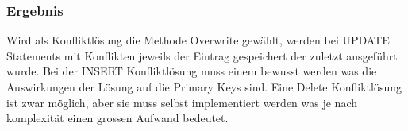 \documentclass[11pt,a4paper,parskip=half]{scrartcl}
\begin{document}
\subsubsection{Ergebnis}
Wird als Konfliktlösung die Methode Overwrite gewählt, werden bei UPDATE Statements mit Konflikten jeweils der Eintrag gespeichert der zuletzt ausgeführt wurde. Bei der INSERT Konfliktlösung muss einem bewusst werden was die Auswirkungen der Lösung auf die Primary Keys sind. Eine Delete Konfliktlösung ist zwar möglich, aber sie muss selbst implementiert werden was je nach komplexität einen grossen Aufwand bedeutet.
\end{document}
